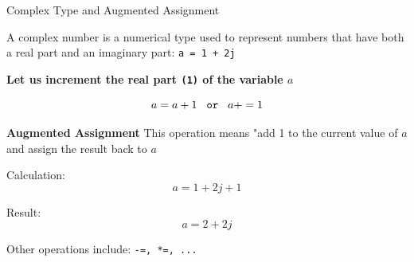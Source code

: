 \documentclass[
	11pt, 
]{beamer}
\begin{document}

\begin{frame}[fragile]{Complex Type and Augmented Assignment} %

A complex number is a numerical type used to represent numbers that have both a real part and an imaginary part: \texttt{a = 1 + 2j}

\vspace{.1cm}

\textbf{Let us increment the real part \texttt{(1)} of the variable $a$}

\[
a = a + 1 \hspace{.3cm} \texttt{or} \hspace{.3cm} a+= 1
\]

\begin{exampleblock}{\textbf{Augmented Assignment}}
This operation means "add 1 to the current value of $a$ and assign the result back to $a$ 
\end{exampleblock}

\vspace{.12cm}

Calculation:
\[
a = 1 + 2j + 1
\]

Result:
\[
a = 2 + 2j
\]

Other operations include: \hspace{.1cm} \texttt{-=, *=, ...}

\end{frame}

\end{document}
